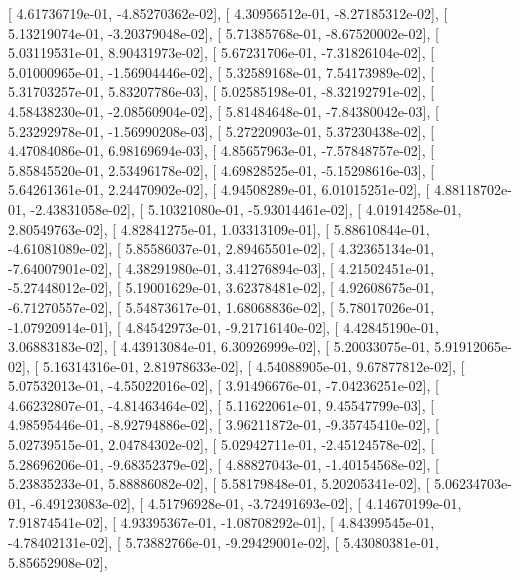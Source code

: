 \documentclass{article}
\begin{document}
       [  4.61736719e-01,  -4.85270362e-02],
       [  4.30956512e-01,  -8.27185312e-02],
       [  5.13219074e-01,  -3.20379048e-02],
       [  5.71385768e-01,  -8.67520002e-02],
       [  5.03119531e-01,   8.90431973e-02],
       [  5.67231706e-01,  -7.31826104e-02],
       [  5.01000965e-01,  -1.56904446e-02],
       [  5.32589168e-01,   7.54173989e-02],
       [  5.31703257e-01,   5.83207786e-03],
       [  5.02585198e-01,  -8.32192791e-02],
       [  4.58438230e-01,  -2.08560904e-02],
       [  5.81484648e-01,  -7.84380042e-03],
       [  5.23292978e-01,  -1.56990208e-03],
       [  5.27220903e-01,   5.37230438e-02],
       [  4.47084086e-01,   6.98169694e-03],
       [  4.85657963e-01,  -7.57848757e-02],
       [  5.85845520e-01,   2.53496178e-02],
       [  4.69828525e-01,  -5.15298616e-03],
       [  5.64261361e-01,   2.24470902e-02],
       [  4.94508289e-01,   6.01015251e-02],
       [  4.88118702e-01,  -2.43831058e-02],
       [  5.10321080e-01,  -5.93014461e-02],
       [  4.01914258e-01,   2.80549763e-02],
       [  4.82841275e-01,   1.03313109e-01],
       [  5.88610844e-01,  -4.61081089e-02],
       [  5.85586037e-01,   2.89465501e-02],
       [  4.32365134e-01,  -7.64007901e-02],
       [  4.38291980e-01,   3.41276894e-03],
       [  4.21502451e-01,  -5.27448012e-02],
       [  5.19001629e-01,   3.62378481e-02],
       [  4.92608675e-01,  -6.71270557e-02],
       [  5.54873617e-01,   1.68068836e-02],
       [  5.78017026e-01,  -1.07920914e-01],
       [  4.84542973e-01,  -9.21716140e-02],
       [  4.42845190e-01,   3.06883183e-02],
       [  4.43913084e-01,   6.30926999e-02],
       [  5.20033075e-01,   5.91912065e-02],
       [  5.16314316e-01,   2.81978633e-02],
       [  4.54088905e-01,   9.67877812e-02],
       [  5.07532013e-01,  -4.55022016e-02],
       [  3.91496676e-01,  -7.04236251e-02],
       [  4.66232807e-01,  -4.81463464e-02],
       [  5.11622061e-01,   9.45547799e-03],
       [  4.98595446e-01,  -8.92794886e-02],
       [  3.96211872e-01,  -9.35745410e-02],
       [  5.02739515e-01,   2.04784302e-02],
       [  5.02942711e-01,  -2.45124578e-02],
       [  5.28696206e-01,  -9.68352379e-02],
       [  4.88827043e-01,  -1.40154568e-02],
       [  5.23835233e-01,   5.88886082e-02],
       [  5.58179848e-01,   5.20205341e-02],
       [  5.06234703e-01,  -6.49123083e-02],
       [  4.51796928e-01,  -3.72491693e-02],
       [  4.14670199e-01,   7.91874541e-02],
       [  4.93395367e-01,  -1.08708292e-01],
       [  4.84399545e-01,  -4.78402131e-02],
       [  5.73882766e-01,  -9.29429001e-02],
       [  5.43080381e-01,   5.85652908e-02],
\end{document}

